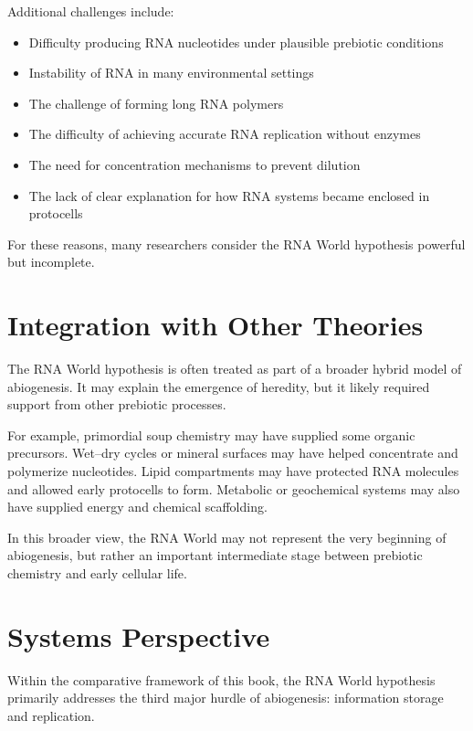 \documentclass[
  oneside]{book}
\providecommand{\tightlist}{%
  \setlength{\itemsep}{0pt}\setlength{\parskip}{0pt}}
\begin{document}
Additional challenges include:

\begin{itemize}
\tightlist
\item
  Difficulty producing RNA nucleotides under plausible prebiotic conditions
\item
  Instability of RNA in many environmental settings
\item
  The challenge of forming long RNA polymers
\item
  The difficulty of achieving accurate RNA replication without enzymes
\item
  The need for concentration mechanisms to prevent dilution
\item
  The lack of clear explanation for how RNA systems became enclosed in protocells
\end{itemize}

For these reasons, many researchers consider the RNA World hypothesis powerful but incomplete.

\section{Integration with Other Theories}\label{integration-with-other-theories-1}

The RNA World hypothesis is often treated as part of a broader hybrid model of abiogenesis. It may explain the emergence of heredity, but it likely required support from other prebiotic processes.

For example, primordial soup chemistry may have supplied some organic precursors. Wet--dry cycles or mineral surfaces may have helped concentrate and polymerize nucleotides. Lipid compartments may have protected RNA molecules and allowed early protocells to form. Metabolic or geochemical systems may also have supplied energy and chemical scaffolding.

In this broader view, the RNA World may not represent the very beginning of abiogenesis, but rather an important intermediate stage between prebiotic chemistry and early cellular life.

\section{Systems Perspective}\label{systems-perspective-1}

Within the comparative framework of this book, the RNA World hypothesis primarily addresses the third major hurdle of abiogenesis: information storage and replication.
\end{document}
